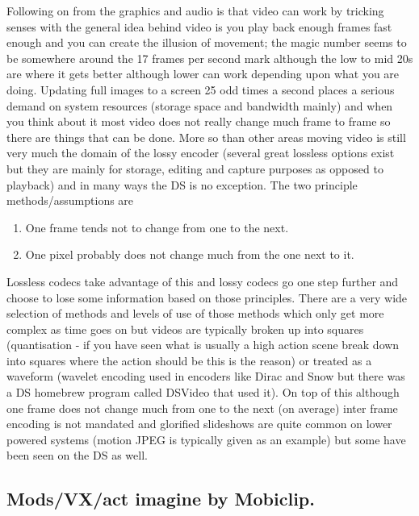 \documentclass[
]{book}
\providecommand{\tightlist}{%
  \setlength{\itemsep}{0pt}\setlength{\parskip}{0pt}}
\begin{document}
Following on from the graphics and audio is that video can work by tricking senses with the general idea behind video is you play back enough frames fast enough and you can create the illusion of movement; the magic number seems to be somewhere around the 17 frames per second mark although the low to mid 20s are where it gets better although lower can work depending upon what you are doing. Updating full images to a screen 25 odd times a second places a serious demand on system resources (storage space and bandwidth mainly) and when you think about it most video does not really change much frame to frame so there are things that can be done. More so than other areas moving video is still very much the domain of the lossy encoder (several great lossless options exist but they are mainly for storage, editing and capture purposes as opposed to playback) and in many ways the DS is no exception. The two principle methods/assumptions are

\begin{enumerate}
\def\labelenumi{\arabic{enumi}.}
\tightlist
\item
  One frame tends not to change from one to the next.
\item
  One pixel probably does not change much from the one next to it.
\end{enumerate}

Lossless codecs take advantage of this and lossy codecs go one step further and choose to lose some information based on those principles. There are a very wide selection of methods and levels of use of those methods which only get more complex as time goes on but videos are typically broken up into squares (quantisation - if you have seen what is usually a high action scene break down into squares where the action should be this is the reason) or treated as a waveform (wavelet encoding used in encoders like Dirac and Snow but there was a DS homebrew program called DSVideo that used it). On top of this although one frame does not change much from one to the next (on average) inter frame encoding is not mandated and glorified slideshows are quite common on lower powered systems (motion JPEG is typically given as an example) but some have been seen on the DS as well.

\hypertarget{modsvxact-imagine-by-mobiclip.}{%
\subsection{Mods/VX/act imagine by Mobiclip.}\label{modsvxact-imagine-by-mobiclip.}}
\end{document}
